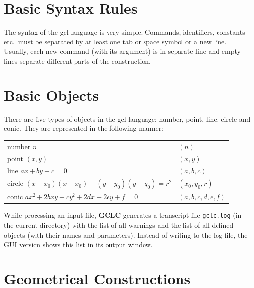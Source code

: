 \documentclass[a4paper]{book}
\newcommand{\gclc}{{\bfseries GCLC}\xspace}
\begin{document}
\section{Basic Syntax Rules}

The syntax of the {\sc gcl} language is very simple. Commands,
identifiers, constants etc.~must be separated by at least one
tab or space symbol or a new line. Usually, each new command
(with its argument) is in separate line and empty lines separate
different parts of the construction.


\section{Basic Objects}
\label{sec:basic_objects}

There are five types of objects in the {\sc gcl} language:
{\sc number}, {\sc point}, {\sc line}, {\sc circle} and {\sc conic}.
They are represented in the following manner:

\begin{tabular}{ll}
{\sc number} $n$                                 & $(n)$\\
{\sc point}  $(x,y)$                             & $(x,y)$\\
{\sc line}   $ax+by+c=0$                         & $(a,b,c)$\\
{\sc circle} $(x-x_0)(x-x_0)+(y-y_0)(y-y_0)=r^2$ & $(x_0,y_0,r)$ \\
{\sc conic} $ax^2+2bxy+cy^2+2dx+2ey+f=0$         & $(a,b,c,d,e,f)$  \\
\end{tabular}

While processing an input file, \gclc generates a transcript
file \verb|gclc.log| (in the current directory) with the list
of all warnings and the list of all defined objects (with
their names and parameters). Instead of writing to the log file,
the GUI version shows this list in its output window.


\section{Geometrical Constructions}
\end{document}
